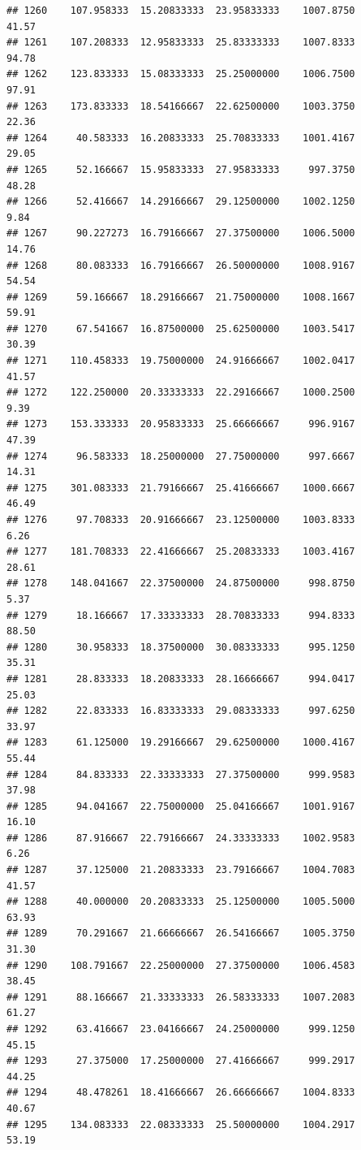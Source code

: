 \documentclass[
]{article}
\begin{document}
\begin{verbatim}
## 1260    107.958333  15.20833333  23.95833333    1007.8750       41.57
## 1261    107.208333  12.95833333  25.83333333    1007.8333       94.78
## 1262    123.833333  15.08333333  25.25000000    1006.7500       97.91
## 1263    173.833333  18.54166667  22.62500000    1003.3750       22.36
## 1264     40.583333  16.20833333  25.70833333    1001.4167       29.05
## 1265     52.166667  15.95833333  27.95833333     997.3750       48.28
## 1266     52.416667  14.29166667  29.12500000    1002.1250        9.84
## 1267     90.227273  16.79166667  27.37500000    1006.5000       14.76
## 1268     80.083333  16.79166667  26.50000000    1008.9167       54.54
## 1269     59.166667  18.29166667  21.75000000    1008.1667       59.91
## 1270     67.541667  16.87500000  25.62500000    1003.5417       30.39
## 1271    110.458333  19.75000000  24.91666667    1002.0417       41.57
## 1272    122.250000  20.33333333  22.29166667    1000.2500        9.39
## 1273    153.333333  20.95833333  25.66666667     996.9167       47.39
## 1274     96.583333  18.25000000  27.75000000     997.6667       14.31
## 1275    301.083333  21.79166667  25.41666667    1000.6667       46.49
## 1276     97.708333  20.91666667  23.12500000    1003.8333        6.26
## 1277    181.708333  22.41666667  25.20833333    1003.4167       28.61
## 1278    148.041667  22.37500000  24.87500000     998.8750        5.37
## 1279     18.166667  17.33333333  28.70833333     994.8333       88.50
## 1280     30.958333  18.37500000  30.08333333     995.1250       35.31
## 1281     28.833333  18.20833333  28.16666667     994.0417       25.03
## 1282     22.833333  16.83333333  29.08333333     997.6250       33.97
## 1283     61.125000  19.29166667  29.62500000    1000.4167       55.44
## 1284     84.833333  22.33333333  27.37500000     999.9583       37.98
## 1285     94.041667  22.75000000  25.04166667    1001.9167       16.10
## 1286     87.916667  22.79166667  24.33333333    1002.9583        6.26
## 1287     37.125000  21.20833333  23.79166667    1004.7083       41.57
## 1288     40.000000  20.20833333  25.12500000    1005.5000       63.93
## 1289     70.291667  21.66666667  26.54166667    1005.3750       31.30
## 1290    108.791667  22.25000000  27.37500000    1006.4583       38.45
## 1291     88.166667  21.33333333  26.58333333    1007.2083       61.27
## 1292     63.416667  23.04166667  24.25000000     999.1250       45.15
## 1293     27.375000  17.25000000  27.41666667     999.2917       44.25
## 1294     48.478261  18.41666667  26.66666667    1004.8333       40.67
## 1295    134.083333  22.08333333  25.50000000    1004.2917       53.19

\end{verbatim}
\end{document}
